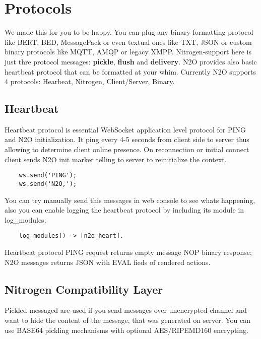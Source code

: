 \section{Protocols}

We made this for you to be happy.
You can plug any binary formatting protocol like BERT, BED, MessagePack
or even textual ones like TXT, JSON or custom binary protocols like MQTT, AMQP or legacy XMPP.
Nitrogen-support here is just thre protocol messages: {\bf pickle}, {\bf flush} and {\bf delivery}.
N2O provides also basic heartbeat protocol that can be formatted at your whim.
Currently N2O supports 4 protocols: Hearbeat, Nitrogen, Client/Server, Binary.

\subsection{Heartbeat}

Heartbeat protocol is essential WebSocket application level protocol for
PING and N2O initialization. It ping every 4-5 seconds from client side to server
thus allowing to determine client online presence. On reconnection or initial connect
client sends N2O init marker telling to server to reinitialize the context.

\vspace{1\baselineskip}
\begin{lstlisting}
    ws.send('PING');
    ws.send('N2O,');
\end{lstlisting}
\vspace{1\baselineskip}

You can try manually send this messages in web console to see whats happening,
also you can enable logging the heartbeat protocol by including its module in log\_modules:

\vspace{1\baselineskip}
\begin{lstlisting}
    log_modules() -> [n2o_heart].
\end{lstlisting}
\vspace{1\baselineskip}

Heartbeat protocol PING request returns empty message NOP binary response;
N2O messages returns JSON with EVAL fieds of rendered actions.

\subsection{Nitrogen Compatibility Layer}

Pickled messaged are used if you send messages over unencrypted
channel and want to hide the content of the message,
that was generated on server. You can use BASE64 pickling mechanisms
with optional AES/RIPEMD160 encrypting.

